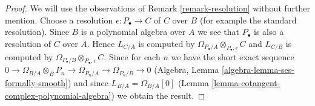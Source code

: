 \documentclass{stacks-project}
\theoremstyle{plain}
\theoremstyle{definition}
\theoremstyle{remark}
\numberwithin{equation}{subsection}
\begin{document}
\begin{proof}
We will use the observations of Remark \ref{remark-resolution}
without further mention. Choose a resolution $\epsilon : P_\bullet \to C$
of $C$ over $B$ (for example the standard resolution). Since $B$ is a
polynomial algebra over $A$ we see that $P_\bullet$ is also a resolution of
$C$ over $A$. Hence $L_{C/A}$ is computed by
$\Omega_{P_\bullet/A} \otimes_{P_\bullet, \epsilon} C$
and $L_{C/B}$ is computed by
$\Omega_{P_\bullet/B} \otimes_{P_\bullet, \epsilon} C$.
Since for each $n$ we have the short exact sequence
$0 \to \Omega_{B/A} \otimes_B P_n \to \Omega_{P_n/A} \to \Omega_{P_n/B} \to 0$
(Algebra, Lemma \ref{algebra-lemma-ses-formally-smooth})
and since $L_{B/A} = \Omega_{B/A}[0]$
(Lemma \ref{lemma-cotangent-complex-polynomial-algebra})
we obtain the result.
\end{proof}
\end{document}
